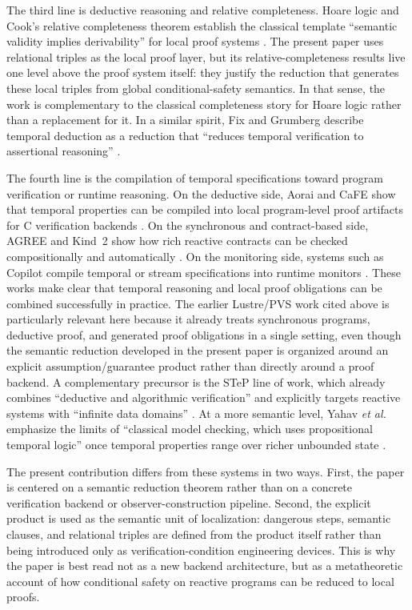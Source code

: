 \documentclass[acmsmall,screen]{acmart}
\theoremstyle{leftplain}
\theoremstyle{leftdefinition}
\theoremstyle{leftremark}
\begin{document}
The third line is deductive reasoning and relative completeness. Hoare logic
and Cook's relative completeness theorem establish the classical template
``semantic validity implies derivability'' for local proof systems
\cite{hoare-1969,cook-1978}. The present paper uses relational triples as the
local proof layer, but its relative-completeness results live one level above
the proof system itself: they justify the reduction that generates these local
triples from global conditional-safety semantics. In that sense, the work is
complementary to the classical completeness story for Hoare logic rather than a
replacement for it. In a similar spirit, Fix and Grumberg describe temporal
deduction as a reduction that ``reduces temporal verification to assertional
reasoning'' \cite{fix-grumberg-1996}.

The fourth line is the compilation of temporal specifications toward program
verification or runtime reasoning. On the deductive side, Aorai and CaFE show
that temporal properties can be compiled into local program-level proof
artifacts for C verification backends \cite{aorai,cafe}. On the synchronous and
contract-based side, AGREE and Kind~2 show how rich reactive contracts can be
checked compositionally and automatically \cite{agree,kind2}. On the monitoring
side, systems such as Copilot compile temporal or stream specifications into
runtime monitors \cite{copilot}. These works make clear that temporal reasoning
and local proof obligations can be combined successfully in practice. The
earlier Lustre/PVS work cited above is particularly relevant here because it
already treats synchronous programs, deductive proof, and generated proof
obligations in a single setting, even though the semantic reduction developed
in the present paper is organized around an explicit assumption/guarantee
product rather than directly around a proof backend. A complementary precursor
is the STeP line of work, which already combines ``deductive and algorithmic
verification'' and explicitly targets reactive systems with ``infinite data
domains'' \cite{step-update-1999}. At a more semantic level, Yahav
\emph{et al.} emphasize the limits of ``classical model checking, which uses
propositional temporal logic'' once temporal properties range over richer
unbounded state \cite{yahav-evolution-logic}.

The present contribution differs from these systems in two ways. First, the
paper is centered on a semantic reduction theorem rather than on a concrete
verification backend or observer-construction pipeline. Second, the explicit product is
used as the semantic unit of localization: dangerous steps, semantic clauses,
and relational triples are defined from the product itself rather than being
introduced only as verification-condition engineering devices. This is why the
paper is best read not as a new backend architecture, but as a metatheoretic
account of how conditional safety on reactive programs can be reduced to local
proofs.
\end{document}
